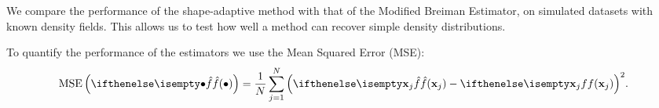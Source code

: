 We compare the performance of the shape-adaptive method with that of the Modified Breiman Estimator, on simulated datasets with known density fields. This allows us to test how well a method can recover simple density distributions. 

To quantify the performance of the estimators we use the Mean Squared Error (MSE):
\begin{equation*}
	\varMSE{\varEstimatedDensityFunction{\bullet}} = \frac{1}{\varNumPatterns} \sum_{\itXs = 1}^{\varNumPatterns} {\left(\varEstimatedDensityFunction{\varPattern[\itXs]} - \varDensityFunction{\varPattern[\itXs]} \right)}^2.
\end{equation*}


